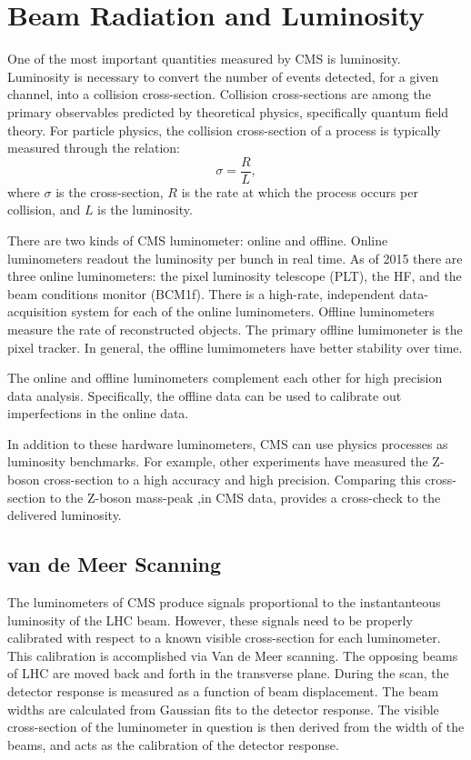 
\chapter{Beam Radiation and Luminosity}

One of the most important quantities measured by CMS is luminosity. Luminosity is necessary to convert the number of events detected, for a given channel, into a collision cross-section. Collision cross-sections are among the primary observables predicted by theoretical physics, specifically quantum field theory. For particle physics, the collision cross-section of a process is typically measured through the relation:
\begin{equation}
\sigma  = \frac{R}{\mathit{L}} ,
\end{equation}
where $\sigma$ is the cross-section, $R$ is the rate at which the process occurs per collision, and $L$ is the luminosity.

There are two kinds of CMS luminometer: online and offline. Online luminometers readout the luminosity per bunch in real time. As of 2015 there are three online luminometers: the pixel luminosity telescope (PLT), the HF, and the beam conditions monitor (BCM1f). There is a high-rate, independent data-acquisition system for each of the online luminometers. Offline luminometers measure the rate of reconstructed objects. The primary offline lumimoneter is the pixel tracker. In general, the offline lumimometers have better stability over time. \cite{CMS:2010gua}

The online and offline luminometers complement each other for high precision data analysis. Specifically, the offline data can be used to calibrate out imperfections in the online data. 

In addition to these hardware luminometers, CMS can use physics processes as luminosity benchmarks.  For example, other experiments have measured the Z-boson cross-section to a high accuracy and high precision. Comparing this cross-section to the Z-boson mass-peak ,in CMS data, provides a cross-check to the delivered luminosity. 

\section{van de Meer Scanning}

The luminometers of CMS produce signals proportional to the instantanteous luminosity of the LHC beam. However, these signals need to be properly calibrated with respect to a known visible cross-section for each luminometer. This calibration is accomplished via Van de Meer scanning. The opposing beams of LHC are moved back and forth in the transverse plane. During the scan, the detector response is measured as a function of beam displacement. The beam widths are calculated from Gaussian fits to the detector response. The visible cross-section of the luminometer in question is then derived from the width of the beams, and acts as the calibration of the detector response. 